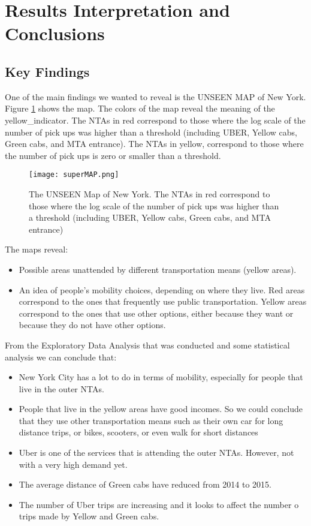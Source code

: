 \section{Results Interpretation and Conclusions}
\label{sec:results}

\subsection{Key Findings}

One of the main findings we wanted to reveal is the UNSEEN MAP of New York. Figure \ref{fig:maxMapTotalPickDrop} shows the map. The colors of the map reveal the meaning of the yellow\_indicator. The NTAs in red correspond to those where the log scale of the number of pick ups was higher than a threshold (including UBER, Yellow cabs, Green cabs, and MTA entrance). The NTAs in yellow, correspond to those where the number of pick ups is zero or smaller than a threshold.

\begin{figure}%
\centering
\texttt{[image: superMAP.png]}
\caption{The UNSEEN Map of New York. The NTAs in red correspond to those where the log scale of the number of pick ups was higher than a threshold (including UBER, Yellow cabs, Green cabs, and MTA entrance)}
\label{fig:maxMapTotalPickDrop}%
\end{figure}


The maps reveal:

\begin{itemize}
\item  Possible areas unattended by different transportation means (yellow areas).
\item  An idea of people's mobility choices, depending on where they live. Red areas correspond to the ones that frequently use public transportation. Yellow areas correspond to the ones that use other options, either because they want or because they do not have other options.
\end{itemize}


From the Exploratory Data Analysis that was conducted and some statistical analysis we can conclude that:

\begin{itemize}
\item New York City has a lot to do in terms of mobility, especially for people that live in the outer NTAs. 
\item  People that live in the yellow areas have good incomes. So we could conclude that they use other transportation means such as their own car for long distance trips, or bikes, scooters, or even walk for short distances
\item Uber is one of the services that is attending the outer NTAs. However, not with a very high demand yet. 
\item The average distance of Green cabs have reduced from 2014 to 2015.  
\item The number of Uber trips are increasing and it looks to affect the number o trips made by Yellow and Green cabs.

\end{itemize}

